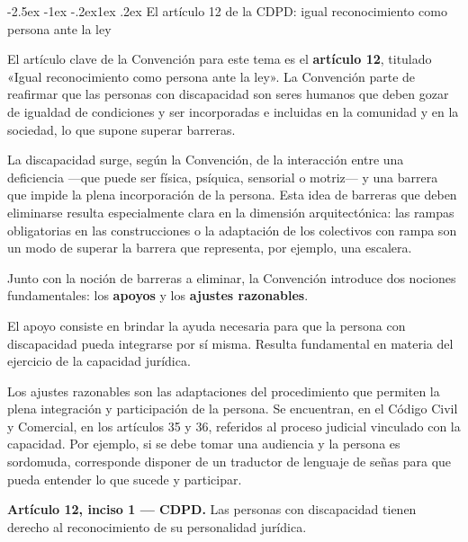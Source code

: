\documentclass[12pt,oneside]{book}
\makeatletter
\renewcommand\subsection{\@startsection{subsection}{2}{\z@}%
  {-2.5ex \@plus -1ex \@minus -.2ex}{1ex \@plus .2ex}%
  {\normalfont\normalsize\bfseries}}
\makeatother
\begin{document}
\subsection{El artículo 12 de la CDPD: igual reconocimiento como persona ante la ley}

El artículo clave de la Convención para este tema es el \textbf{artículo 12}, titulado «Igual reconocimiento como persona ante la ley». La Convención parte de reafirmar que las personas con discapacidad son seres humanos que deben gozar de igualdad de condiciones y ser incorporadas e incluidas en la comunidad y en la sociedad, lo que supone superar barreras.

La discapacidad surge, según la Convención, de la interacción entre una deficiencia ---que puede ser física, psíquica, sensorial o motriz--- y una barrera que impide la plena incorporación de la persona. Esta idea de barreras que deben eliminarse resulta especialmente clara en la dimensión arquitectónica: las rampas obligatorias en las construcciones o la adaptación de los colectivos con rampa son un modo de superar la barrera que representa, por ejemplo, una escalera.

Junto con la noción de barreras a eliminar, la Convención introduce dos nociones fundamentales: los \textbf{apoyos} y los \textbf{ajustes razonables}.

\begin{definicion}
El apoyo consiste en brindar la ayuda necesaria para que la persona con discapacidad pueda integrarse por sí misma. Resulta fundamental en materia del ejercicio de la capacidad jurídica.
\end{definicion}

\begin{definicion}
Los ajustes razonables son las adaptaciones del procedimiento que permiten la plena integración y participación de la persona. Se encuentran, en el Código Civil y Comercial, en los artículos 35 y 36, referidos al proceso judicial vinculado con la capacidad. Por ejemplo, si se debe tomar una audiencia y la persona es sordomuda, corresponde disponer de un traductor de lenguaje de señas para que pueda entender lo que sucede y participar.
\end{definicion}

\begin{importante}
\textbf{Artículo 12, inciso 1 --- CDPD.} Las personas con discapacidad tienen derecho al reconocimiento de su personalidad jurídica.
\end{importante}
\end{document}
